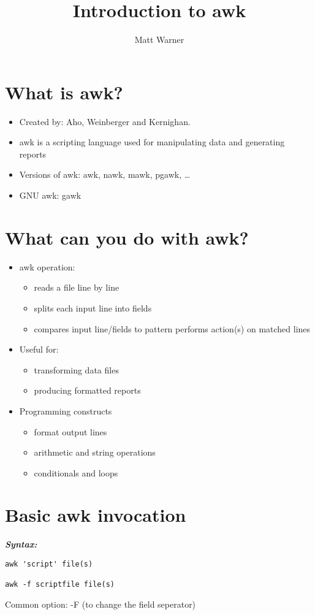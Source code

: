 \documentclass{report}
\title{\Huge{Introduction to awk}}
\author{\huge{Matt Warner}}
\date{\huge{}}
\begin{document}
  \maketitle
  \tableofcontents
  \clearpage
  \section{What is awk?}  
  \begin{itemize}
    \item Created by: 
      \subitem Aho, Weinberger and Kernighan.
    \item awk is a scripting language used for manipulating data and generating reports
    \item Versions of awk:
      \subitem awk, nawk, mawk, pgawk, \ldots
    \item GNU awk: gawk
  \end{itemize}
\section{What can you do with awk?}
\begin{itemize}
  \item awk operation: 
    \begin{itemize}[label=$\circ$]
      \item reads a file line by line 
      \item splits each input line into fields
      \item compares input line/fields to pattern
        performs action(s) on matched lines
    \end{itemize}
  \item Useful for:
    \begin{itemize}[label=$\circ$]
      \item transforming data files 
      \item producing formatted reports
    \end{itemize}
  \item Programming constructs
    \begin{itemize}[label=$\circ$]
      \item format output lines 
      \item arithmetic and string operations
      \item conditionals and loops
    \end{itemize}
\end{itemize}
\section{Basic awk invocation}
\bigbreak \noindent
\textbf{\textit{Syntax:}}
\begin{verbatim}
awk 'script' file(s)

awk -f scriptfile file(s) 
\end{verbatim}
\bigbreak \noindent
   Common option: -F (to change the field seperator)
\end{document}
